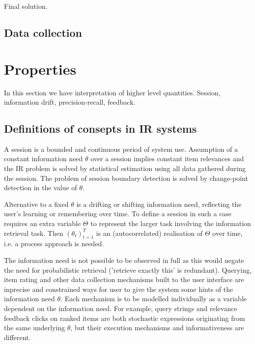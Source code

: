 \documentclass[10pt]{tufte-handout}
\begin{document}
\begin{marginfigure}%
\noindent{}
\caption{Final solution.}
\label{fig:graph5}
\end{marginfigure}

\subsection{Data collection}


\section{Properties}

In this section we have interpretation of higher level quantities. Session, information drift, precision-recall, feedback.

\subsection{Definitions of consepts in IR systems}
A session is a bounded and continuous period of system use. Assumption of a constant information need $\theta$ over a session implies constant item relevances and the IR problem is solved by statistical estimation using all data gathered during the session. The problem of session boundary detection is solved by change-point detection in the value of $\theta$. 

Alternative to a fixed $\theta$ is a drifting or shifting information need, reflecting the user's learning or remembering over time. To define a session in such a case requires an extra variable $\Theta$ to represent the larger task involving the information retrieval task. Then $(\theta_t)_{t=1}^T$ is an (autocorrelated) realisation of $\Theta$ over time, i.e. a process approach is needed.

The information need is not possible to be observed in full as this would negate the need for probabilistic retrieval ('retrieve exactly this' is redundant). Querying, item rating and other data collection mechanisms built to the user interface are inprecise and constrained ways for user to give the system some hints of the information need $\theta$. Each mechanism is to be modelled individually as a variable dependent on the information need. For example, query strings and relevance feedback clicks on ranked items are both stochastic expressions originating from the same underlying $\theta$, but their execution mechanisms and informativeness are different.
\end{document}
